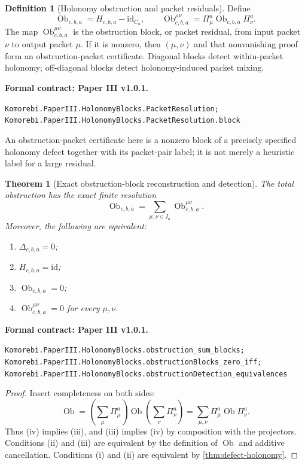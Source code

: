 \documentclass[11pt,a4paper]{article}
\newtheorem{theorem}{Theorem}[section]
\theoremstyle{plain}
\theoremstyle{definition}
\newtheorem{definition}[definition]{Definition}
\theoremstyle{remark}
\newcommand{\id}{\mathrm{id}}
\newcommand{\Ob}{\operatorname{Ob}}
\newcommand{\leanname}[1]{\nolinkurl{#1}}
\newcommand{\statusleanthree}[1]{\par\smallskip\noindent\begin{minipage}{\linewidth}{\color{leanblue}\textbf{Formal contract: Paper III v1.0.1.}}\par\begingroup\small\raggedright\leanname{#1}\par\endgroup\end{minipage}\par\smallskip}
\begin{document}
\begin{definition}[Holonomy obstruction and packet residuals]
\label{def:obstruction-packet}
Define
\[
\Ob_{c,b,a}=H_{c,b,a}-\id_{C_a},
\qquad
\Ob^{\mu\nu}_{c,b,a}
=
\Pi^a_\mu\Ob_{c,b,a}\Pi^a_\nu.
\]
The map $\Ob^{\mu\nu}_{c,b,a}$ is the obstruction block, or packet residual,
from input packet $\nu$ to output packet $\mu$.  If it is nonzero, then
$(\mu,\nu)$ and that nonvanishing proof form an obstruction-packet
certificate.  Diagonal blocks detect within-packet holonomy; off-diagonal
blocks detect holonomy-induced packet mixing.
\end{definition}
\statusleanthree{Komorebi.PaperIII.HolonomyBlocks.PacketResolution; Komorebi.PaperIII.HolonomyBlocks.PacketResolution.block}

An obstruction-packet certificate here is a nonzero block of a precisely
specified holonomy defect together with its packet-pair label; it is not
merely a heuristic label for a large residual.

\begin{theorem}[Exact obstruction-block reconstruction and detection]
\label{thm:obstruction-detection}
The total obstruction has the exact finite resolution
\[
\boxed{
\Ob_{c,b,a}
=
\sum_{\mu,\nu\in I_a}
\Ob^{\mu\nu}_{c,b,a}.
}
\]
Moreover, the following are equivalent:
\begin{enumerate}[label=(\roman*)]
\item $\Delta_{c,b,a}=0$;
\item $H_{c,b,a}=\id$;
\item $\Ob_{c,b,a}=0$;
\item $\Ob^{\mu\nu}_{c,b,a}=0$ for every $\mu,\nu$.
\end{enumerate}
\end{theorem}
\statusleanthree{Komorebi.PaperIII.HolonomyBlocks.obstruction_sum_blocks; Komorebi.PaperIII.HolonomyBlocks.obstructionBlocks_zero_iff; Komorebi.PaperIII.HolonomyBlocks.obstructionDetection_equivalences}

\begin{proof}
Insert completeness on both sides:
\[
\Ob
=
\left(\sum_\mu\Pi^a_\mu\right)
\Ob
\left(\sum_\nu\Pi^a_\nu\right)
=
\sum_{\mu,\nu}\Pi^a_\mu\Ob\Pi^a_\nu.
\]
Thus (iv) implies (iii), and (iii) implies (iv) by composition with the
projectors.  Conditions (ii) and (iii) are equivalent by the definition of
$\Ob$ and additive cancellation.
Conditions (i) and (ii) are equivalent by
\cref{thm:defect-holonomy}.
\end{proof}
\end{document}
